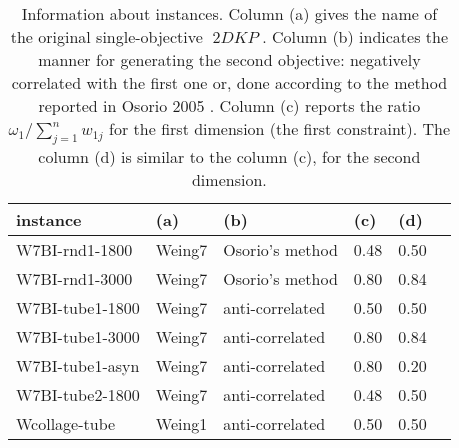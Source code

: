 \documentclass[11pt]{amsart}
\DeclareMathOperator{\BDKP}{2\mathit{DKP}}
\begin{document}
\begin{table}[ht]
	\centering
	\caption{Information about instances. Column (a) gives the name of the original single-objective $\BDKP$.
Column (b) indicates the manner for generating the second objective: negatively correlated with the first one or, done according to the method reported in Osorio 2005 \cite{Osorio:2005}. %
Column (c) reports   the ratio $\omega_1 / \sum_{j=1}^n{w_{1j}}$ for the first dimension (the first constraint). The column (d) is similar to the column (c), for the second dimension.}
	\label{tab:instances}
	\begin{tabular}{llllll}
		\toprule
		instance 			& (a) 		& (b)  & (c)	& (d) 		\\
		\midrule
		W7BI-rnd1-1800		& Weing7		& Osorio's method			& 0.48				& 0.50					\\
		W7BI-rnd1-3000		& Weing7		& Osorio's method			& 0.80				& 0.84					\\
		W7BI-tube1-1800		& Weing7	 	& anti-correlated			& 0.50				& 0.50					\\
		W7BI-tube1-3000		& Weing7	 	& anti-correlated			& 0.80				& 0.84					\\
		W7BI-tube1-asyn		& Weing7	 	& anti-correlated			& 0.80				& 0.20					\\
		W7BI-tube2-1800		& Weing7	 	& anti-correlated			& 0.48				& 0.50					\\
		Wcollage-tube		& Weing1	 	& anti-correlated			& 0.50				& 0.50					\\
		\bottomrule
	\end{tabular}
\end{table}
\end{document}

